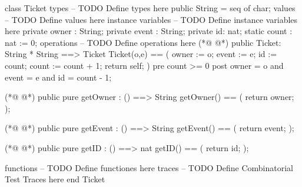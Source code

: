 \begin{vdmpp}[breaklines=true]
class Ticket
types
-- TODO Define types here
 public String = seq of char;
values
-- TODO Define values here
instance variables
-- TODO Define instance variables here
 private owner : String;
 private event : String;
 private id: nat; 
 static count : nat := 0;
operations
-- TODO Define operations here
(*@
\label{Ticket:15}
@*)
 public Ticket: String * String ==> Ticket
 Ticket(o,e) == (
  owner := o; 
  event := e; 
  id := count; 
  count := count + 1;
  return self;
 )
 pre count >= 0
 post owner = o and event = e and id = count - 1;
 
(*@
\label{getOwner:26}
@*)
 public pure getOwner : () ==> String
 getOwner() == (
  return owner;
 );
 
(*@
\label{getEvent:31}
@*)
 public pure getEvent : () ==> String
 getEvent() == (
  return event;
 );
 
(*@
\label{getID:36}
@*)
 public pure getID : () ==> nat
 getID() == (
  return id;
 );
    
functions
-- TODO Define functiones here
traces
-- TODO Define Combinatorial Test Traces here
end Ticket
\end{vdmpp}

